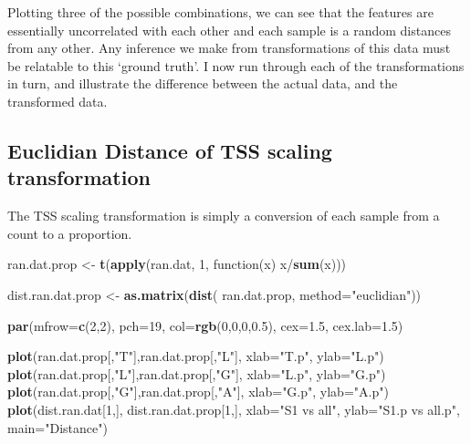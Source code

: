 \documentclass[twocolumn]{article}
\newenvironment{Shaded}{\begin{snugshade}}{\end{snugshade}}
\newcommand{\KeywordTok}[1]{\textcolor[rgb]{0.13,0.29,0.53}{\textbf{{#1}}}}
\newcommand{\DataTypeTok}[1]{\textcolor[rgb]{0.13,0.29,0.53}{{#1}}}
\newcommand{\DecValTok}[1]{\textcolor[rgb]{0.00,0.00,0.81}{{#1}}}
\newcommand{\FloatTok}[1]{\textcolor[rgb]{0.00,0.00,0.81}{{#1}}}
\newcommand{\StringTok}[1]{\textcolor[rgb]{0.31,0.60,0.02}{{#1}}}
\newcommand{\NormalTok}[1]{{#1}}
\begin{document}
Plotting three of the possible combinations, we can see that the
features are essentially uncorrelated with each other and each sample is
a random distances from any other. Any inference we make from
transformations of this data must be relatable to this `ground truth'. I
now run through each of the transformations in turn, and illustrate the
difference between the actual data, and the transformed data.

\subsection{Euclidian Distance of TSS scaling transformation}

The TSS scaling transformation is simply a conversion of each sample
from a count to a proportion.

\begin{Shaded}
\begin{Highlighting}[]
\NormalTok{ran.dat.prop <-}\StringTok{ }\KeywordTok{t}\NormalTok{(}\KeywordTok{apply}\NormalTok{(ran.dat, }\DecValTok{1}\NormalTok{,}
    \NormalTok{function(x) x/}\KeywordTok{sum}\NormalTok{(x)))}

\NormalTok{dist.ran.dat.prop <-}\StringTok{ }\KeywordTok{as.matrix}\NormalTok{(}\KeywordTok{dist}\NormalTok{(}
    \NormalTok{ran.dat.prop, }\DataTypeTok{method=}\StringTok{"euclidian"}\NormalTok{))}

\KeywordTok{par}\NormalTok{(}\DataTypeTok{mfrow=}\KeywordTok{c}\NormalTok{(}\DecValTok{2}\NormalTok{,}\DecValTok{2}\NormalTok{), }\DataTypeTok{pch=}\DecValTok{19}\NormalTok{, }\DataTypeTok{col=}\KeywordTok{rgb}\NormalTok{(}\DecValTok{0}\NormalTok{,}\DecValTok{0}\NormalTok{,}\DecValTok{0}\NormalTok{,}\FloatTok{0.5}\NormalTok{),}
    \DataTypeTok{cex=}\FloatTok{1.5}\NormalTok{, }\DataTypeTok{cex.lab=}\FloatTok{1.5}\NormalTok{)}

\KeywordTok{plot}\NormalTok{(ran.dat.prop[,}\StringTok{"T"}\NormalTok{],ran.dat.prop[,}\StringTok{"L"}\NormalTok{],}
    \DataTypeTok{xlab=}\StringTok{"T.p"}\NormalTok{, }\DataTypeTok{ylab=}\StringTok{"L.p"}\NormalTok{)}
\KeywordTok{plot}\NormalTok{(ran.dat.prop[,}\StringTok{"L"}\NormalTok{],ran.dat.prop[,}\StringTok{"G"}\NormalTok{],}
    \DataTypeTok{xlab=}\StringTok{"L.p"}\NormalTok{, }\DataTypeTok{ylab=}\StringTok{"G.p"}\NormalTok{)}
\KeywordTok{plot}\NormalTok{(ran.dat.prop[,}\StringTok{"G"}\NormalTok{],ran.dat.prop[,}\StringTok{"A"}\NormalTok{],}
    \DataTypeTok{xlab=}\StringTok{"G.p"}\NormalTok{, }\DataTypeTok{ylab=}\StringTok{"A.p"}\NormalTok{)}
\KeywordTok{plot}\NormalTok{(dist.ran.dat[}\DecValTok{1}\NormalTok{,], dist.ran.dat.prop[}\DecValTok{1}\NormalTok{,],}
    \DataTypeTok{xlab=}\StringTok{"S1 vs all"}\NormalTok{, }\DataTypeTok{ylab=}\StringTok{"S1.p vs all.p"}\NormalTok{,}
    \DataTypeTok{main=}\StringTok{"Distance"}\NormalTok{)}
\end{Highlighting}
\end{Shaded}
\end{document}
